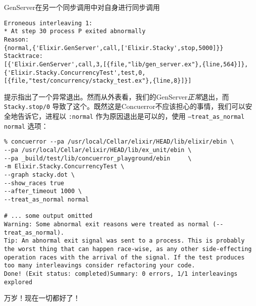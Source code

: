 \begin{example}{GenServer在另一个同步调用中对自身进行同步调用}
\begin{code}{}
\begin{verbatim}
Erroneous interleaving 1:
* At step 30 process P exited abnormally
Reason:
{normal,{'Elixir.GenServer',call,['Elixir.Stacky',stop,5000]}}
Stacktrace:
[{'Elixir.GenServer',call,3,[{file,"lib/gen_server.ex"},{line,564}]},
{'Elixir.Stacky.ConcurrencyTest',test,0,[{file,"test/concurrency/stacky_test.ex"},{line,8}]}]
\end{verbatim}
\end{code}

提示指出了一个异常退出。然而从外表看，我们的GenServer\emph{正常}退出，而
\texttt{Stacky.stop/0}
导致了这个。既然这是Concuerror不应该担心的事情，我们可以安全地告诉它，进程以
\texttt{:normal} 作为原因退出是可以的，使用
\texttt{--treat\_as\_normal normal} 选项：

\begin{code}{}
\begin{verbatim}
% concuerror --pa /usr/local/Cellar/elixir/HEAD/lib/elixir/ebin \
--pa /usr/local/Cellar/elixir/HEAD/lib/ex_unit/ebin \
--pa _build/test/lib/concuerror_playground/ebin     \
-m Elixir.Stacky.ConcurrencyTest \
--graph stacky.dot \
--show_races true  
--after_timeout 1000 \
--treat_as_normal normal

# ... some output omitted
Warning: Some abnormal exit reasons were treated as normal (--treat_as_normal).
Tip: An abnormal exit signal was sent to a process. This is probably the worst thing that can happen race-wise, as any other side-effecting operation races with the arrival of the signal. If the test produces too many interleavings consider refactoring your code.
Done! (Exit status: completed)Summary: 0 errors, 1/1 interleavings explored
\end{verbatim}
\end{code}

万岁！现在一切都好了！
\end{example}


